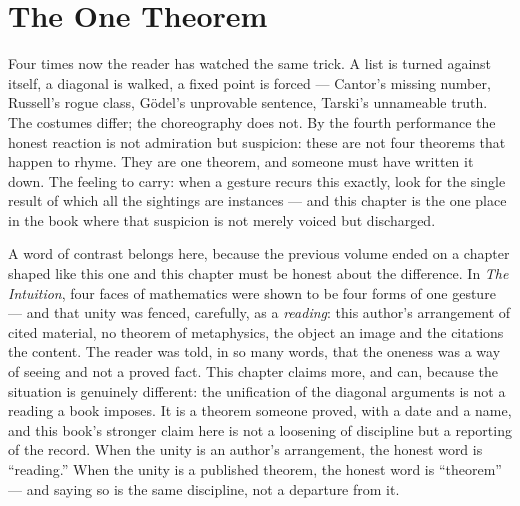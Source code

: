 \chapter{The One Theorem}

\begin{intuition}
Four times now the reader has watched the same trick. A list is turned
against itself, a diagonal is walked, a fixed point is forced --- Cantor's
missing number, Russell's rogue class, G\"odel's unprovable sentence,
Tarski's unnameable truth. The costumes differ; the choreography does not.
By the fourth performance the honest reaction is not admiration but
suspicion: these are not four theorems that happen to rhyme. They are one
theorem, and someone must have written it down. The feeling to carry:
when a gesture recurs this exactly, look for the single result of which
all the sightings are instances --- and this chapter is the one place in
the book where that suspicion is not merely voiced but discharged.
\end{intuition}

A word of contrast belongs here, because the previous volume ended on a
chapter shaped like this one and this chapter must be honest about the
difference. In \emph{The Intuition}, four faces of mathematics were shown
to be four forms of one gesture --- and that unity was fenced, carefully,
as a \emph{reading}: this author's arrangement of cited material, no
theorem of metaphysics, the object an image and the citations the content.
The reader was told, in so many words, that the oneness was a way of
seeing and not a proved fact. This chapter claims more, and can, because
the situation is genuinely different: the unification of the diagonal
arguments is not a reading a book imposes. It is a theorem someone proved,
with a date and a name, and this book's stronger claim here is not a
loosening of discipline but a reporting of the record. When the unity is
an author's arrangement, the honest word is ``reading.'' When the unity is
a published theorem, the honest word is ``theorem'' --- and saying so is
the same discipline, not a departure from it.

